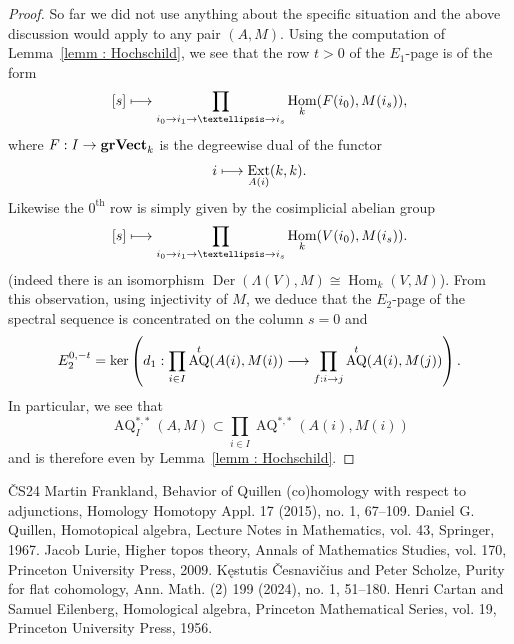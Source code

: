 \documentclass[10pt]{amsart}
\theoremstyle{definition}\newtheorem{defi}[theo]{Definition}\newtheorem{rema}[theo]{Remark}\newtheorem{exam}[theo]{Example}\newtheorem{exem}[theo]{Example}\newtheorem{nota}[theo]{Notation}
\renewcommand{\rm}[1]{{\mathrm{#1}}}
\DeclareMathOperator{\Ext}{Ext}
\DeclareMathOperator{\Hom}{Hom}
\DeclareMathOperator{\Der}{Der}
\DeclareMathOperator{\AQ}{AQ}
\newcommand{\grVect}{\mathbf{grVect}}
\renewcommand*{\to}{\mathchoice{\longrightarrow}{\rightarrow}{\rightarrow}{\rightarrow}}
\let\oldmapsto\mapsto
\renewcommand*{\mapsto}{\mathchoice{\longmapsto}{\oldmapsto}{\oldmapsto}{\oldmapsto}}
\begin{document}
\begin{proof}
So far we did not use anything about the specific situation and the above discussion would apply to any pair $(A,M)$. Using the computation of Lemma~\ref{lemm : Hochschild}, we see that the row $t>0$ of the $E_1$-page is of the form
\[
[s]\mapsto \prod_{i_0\to i_1\to\ldots\to i_s}\Hom_k(F(i_0),M(i_s)),
\]
where $F: I\to\grVect_k$ is the degreewise dual of the functor
\[
i\mapsto \Ext_{A(i)}(k,k).
\]
Likewise the $0^{\rm{th}}$ row is simply given by the cosimplicial abelian group
\[
[s]\mapsto \prod_{i_0\to i_1\to\ldots\to i_s}\Hom_k(V(i_0),M(i_s)).
\]
(indeed there is an isomorphism $\Der(\Lambda(V),M)\cong\Hom_k(V,M)$). From this observation, using injectivity of $M$, we deduce that the $E_2$-page of the spectral sequence is concentrated on the column $s=0$ and
\[
E_2^{0,-t}=\ker\left(d_1: \prod_{i\in I}\AQ^{t}(A(i),M(i))\to \prod_{f: i\to j}\AQ^{t}(A(i),M(j))\right).
\]
In particular, we see that
\[
\AQ^{*,*}_I(A,M)\subset\prod_{i\in I}\AQ^{*,*}(A(i),M(i))
\]
and is therefore even by Lemma~\ref{lemm : Hochschild}.
\end{proof}
\begin{thebibliography}{ČS24}
 Martin Frankland, Behavior of Quillen (co)homology with respect to adjunctions, Homology Homotopy Appl. 17 (2015), no. 1, 67–109.
 Daniel G. Quillen, Homotopical algebra, Lecture Notes in Mathematics, vol. 43, Springer, 1967.
 Jacob Lurie, Higher topos theory, Annals of Mathematics Studies, vol. 170, Princeton University Press, 2009.
 Kęstutis Česnavičius and Peter Scholze, Purity for flat cohomology, Ann. Math. (2) 199 (2024), no. 1, 51–180.
 Henri Cartan and Samuel Eilenberg, Homological algebra, Princeton Mathematical Series, vol. 19, Princeton University Press, 1956.
\end{thebibliography}
\end{document}
